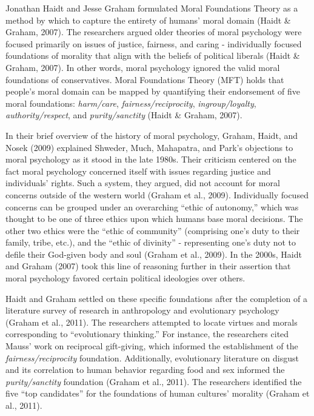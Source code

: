 \documentclass[english,,man]{apa6}
\begin{document}
Jonathan Haidt and Jesse Graham formulated Moral Foundations Theory as a method by which to capture the entirety of humans' moral domain (Haidt \& Graham, 2007). The researchers argued older theories of moral psychology were focused primarily on issues of justice, fairness, and caring - individually focused foundations of morality that align with the beliefs of political liberals (Haidt \& Graham, 2007). In other words, moral psychology ignored the valid moral foundations of conservatives. Moral Foundations Theory (MFT) holds that people's moral domain can be mapped by quantifying their endorsement of five moral foundations: \emph{harm/care}, \emph{fairness/reciprocity}, \emph{ingroup/loyalty}, \emph{authority/respect}, and \emph{purity/sanctity} (Haidt \& Graham, 2007).

In their brief overview of the history of moral psychology, Graham, Haidt, and Nosek (2009) explained Shweder, Much, Mahapatra, and Park's objections to moral psychology as it stood in the late 1980s. Their criticism centered on the fact moral psychology concerned itself with issues regarding justice and individuals' rights. Such a system, they argued, did not account for moral concerns outside of the western world (Graham et al., 2009). Individually focused concerns can be grouped under an overarching \enquote{ethic of autonomy,} which was thought to be one of three ethics upon which humans base moral decisions. The other two ethics were the \enquote{ethic of community} (comprising one's duty to their family, tribe, etc.), and the \enquote{ethic of divinity} - representing one's duty not to defile their God-given body and soul (Graham et al., 2009). In the 2000s, Haidt and Graham (2007) took this line of reasoning further in their assertion that moral psychology favored certain political ideologies over others.

Haidt and Graham settled on these specific foundations after the completion of a literature survey of research in anthropology and evolutionary psychology (Graham et al., 2011). The researchers attempted to locate virtues and morals corresponding to \enquote{evolutionary thinking.} For instance, the researchers cited Mauss' work on reciprocal gift-giving, which informed the establishment of the \emph{fairness/reciprocity} foundation. Additionally, evolutionary literature on disgust and its correlation to human behavior regarding food and sex informed the \emph{purity/sanctity} foundation (Graham et al., 2011). The researchers identified the five \enquote{top candidates} for the foundations of human cultures' morality (Graham et al., 2011).
\end{document}
